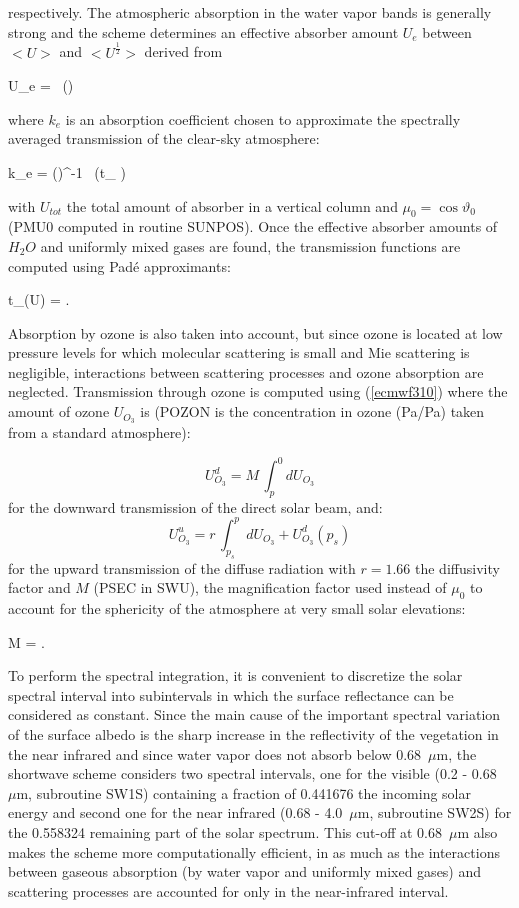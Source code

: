 \noindent respectively. The atmospheric absorption in the water vapor bands is generally strong and the
scheme determines an effective absorber amount $U_e$ between $<U>$ and
$<U^{\frac{1}{2}}>$ derived from

\medskip
\be
U_e =  \, \ln()
\label{ecmwf38}
\ee
\medskip

\noindent where $k_e$ is an absorption coefficient chosen to approximate the spectrally averaged transmission of the clear-sky atmosphere:

\medskip
\be
k_e = ()^{-1} \, \ln(t_{\Delta\nu} )
\label{ecmwf39}
\ee
\medskip

\noindent with $U_{tot}$ the total amount of absorber in a vertical column and
$\mu_0 =\cos\vartheta _0$ (PMU0 computed in routine SUNPOS). Once the effective
absorber amounts of $H_{2}O$ and uniformly mixed gases are found, the
transmission functions are computed using Pad\'e approximants:

\medskip
\be
t_{\Delta\nu}(U) = .
\label{ecmwf310}
\ee
\medskip

Absorption by ozone is also taken into account, but since ozone is located at
low pressure levels for which molecular scattering is small and Mie scattering
is negligible, interactions between scattering processes and ozone absorption
are neglected. Transmission through ozone is computed using (\ref{ecmwf310})
where the amount of ozone $U_{O_3}$ is (POZON is the concentration in ozone
(Pa/Pa) taken from a standard atmosphere):

%
\medskip
\[
U_{O_3}^d = M \, \int_{p}^{0}{dU_{O_3}}
\]
for the downward transmission of the direct solar beam, and:
\[
U_{O_3}^u = r \, \int_{p_s}^{p}{dU_{O_3}} + U_{O_3}^d(p_s)
\]
for the upward transmission of the diffuse radiation with $r = 1.66$ the
diffusivity factor and $M$ (PSEC in SWU), the magnification factor
\citep{Rodgers1967} used instead of $\mu_0$ to account for the sphericity of the
atmosphere at very small solar elevations:

\medskip
\be
M = .
\label{ecmwf311}
\ee
\medskip

To perform the spectral integration, it is convenient to discretize the solar
spectral interval into subintervals in which the surface reflectance can be
considered as constant. Since the main cause of the important spectral variation
of the surface albedo is the sharp increase in the reflectivity of the
vegetation in the near infrared and since water vapor does not absorb below
0.68~$\mu$m, the shortwave scheme considers two spectral intervals, one for the
visible (0.2 - 0.68~$\mu$m, subroutine SW1S) containing a fraction of 0.441676
the incoming solar energy and second one for the near infrared
(0.68 - 4.0~$\mu$m, subroutine SW2S) for the 0.558324 remaining part of the
solar spectrum. This cut-off at 0.68~$\mu$m also makes the scheme more
computationally efficient, in as much as the interactions between gaseous
absorption (by water vapor and uniformly mixed gases) and scattering processes
are accounted for only in the near-infrared interval.

